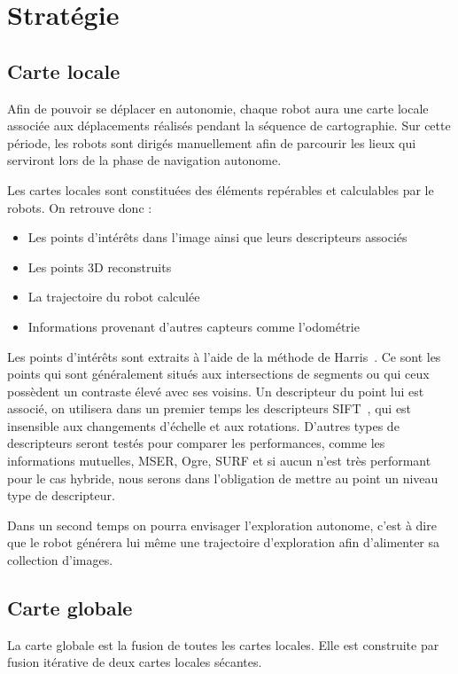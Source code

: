 \section{Stratégie}
\label{sec:strategie}

\subsection{Carte locale}

Afin de pouvoir se déplacer en autonomie, chaque robot aura une carte locale associée aux déplacements réalisés pendant la séquence de cartographie.
Sur cette période, les robots sont dirigés manuellement afin de parcourir les lieux qui serviront lors de la phase de navigation autonome.

Les cartes locales sont constituées des éléments repérables et calculables par le robots.
On retrouve donc :
\begin{itemize}
\item Les points d'intérêts dans l'image ainsi que leurs descripteurs associés
\item Les points 3D reconstruits
\item La trajectoire du robot calculée
\item Informations provenant d'autres capteurs comme l'odométrie
\end{itemize}

Les points d'intérêts sont extraits à l'aide de la méthode de Harris~\cite{Harris88}. Ce sont les points qui sont généralement situés aux intersections de segments ou qui ceux possèdent un contraste élevé avec ses voisins.
Un descripteur du point lui est associé, on utilisera dans un premier temps les descripteurs SIFT~\cite{Lowe99}, qui est insensible aux changements d'échelle et aux rotations.
D'autres types de descripteurs seront testés pour comparer les performances, comme les informations mutuelles, MSER, Ogre, SURF et si aucun n'est très performant pour le cas hybride, nous serons dans l'obligation de mettre au point un niveau type de descripteur.

Dans un second temps on pourra envisager l'exploration autonome, c'est à dire que le robot générera lui même une trajectoire d'exploration afin d'alimenter sa collection d'images.

\subsection{Carte globale}

La carte globale est la fusion de toutes les cartes locales.
Elle est construite par fusion itérative de deux cartes locales sécantes.

